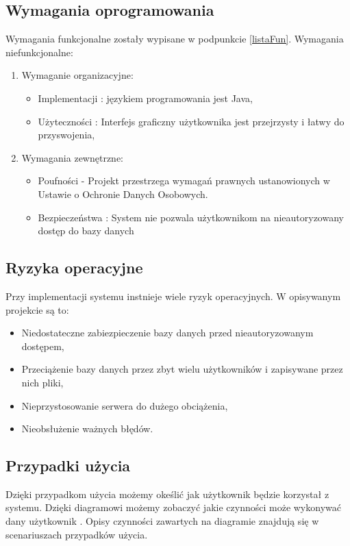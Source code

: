 \subsection{Wymagania oprogramowania}
Wymagania funkcjonalne zostały wypisane w podpunkcie \ref{listaFun}.
Wymagania niefunkcjonalne:
\begin{enumerate}
	\item Wymaganie organizacyjne:
		\begin{itemize}
			\item Implementacji : językiem programowania jest Java,
			\item Użyteczności : Interfejs graficzny użytkownika jest przejrzysty i łatwy do przyswojenia,
		\end{itemize}
	\item Wymagania zewnętrzne:		
		\begin{itemize}
			\item Poufności - Projekt przestrzega wymagań prawnych ustanowionych w Ustawie o Ochronie Danych Osobowych.
			\item Bezpieczeństwa : System nie pozwala użytkownikom na nieautoryzowany dostęp do bazy danych
		\end{itemize}
\end{enumerate}
\subsection{Ryzyka operacyjne}
Przy implementacji systemu instnieje wiele ryzyk operacyjnych. W opisywanym projekcie są to:
\begin{itemize}
	\item Niedostateczne zabiezpieczenie bazy danych przed nieautoryzowanym dostępem,
	\item Przeciążenie bazy danych przez zbyt wielu użytkowników i zapisywane przez nich pliki,
	\item Nieprzystosowanie serwera do dużego obciążenia,
	\item Nieobsłużenie ważnych błędów.
\end{itemize}
\subsection{Przypadki użycia}
Dzięki przypadkom użycia możemy okeślić jak użytkownik będzie korzystał z systemu. Dzięki diagramowi możemy zobaczyć jakie czynności może wykonywać dany użytkownik \cite{DOC03}. Opisy czynności zawartych na diagramie znajdują się w scenariuszach przypadków użycia.

